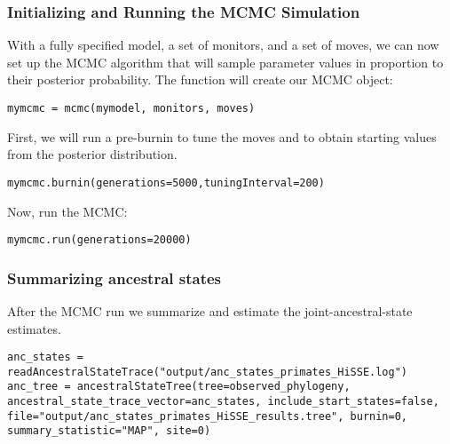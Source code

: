 \subsubsection{Initializing and Running the MCMC Simulation}

With a fully specified model, a set of monitors, and a set of moves, we can now set up the MCMC algorithm that will sample parameter values in proportion to their posterior probability. 
The  function will create our MCMC object:
{\tt \begin{snugshade*}
\begin{lstlisting}
mymcmc = mcmc(mymodel, monitors, moves)
\end{lstlisting}
\end{snugshade*}}

First, we will run a pre-burnin to tune the moves and to obtain starting values from the posterior distribution.
{\tt \begin{snugshade*}
\begin{lstlisting}
mymcmc.burnin(generations=5000,tuningInterval=200)
\end{lstlisting}
\end{snugshade*}}

Now, run the MCMC:
{\tt \begin{snugshade*}
\begin{lstlisting}
mymcmc.run(generations=20000)
\end{lstlisting}
\end{snugshade*}}


\subsubsection{Summarizing ancestral states}
After the MCMC run we summarize and estimate the joint-ancestral-state estimates.
{\tt \begin{snugshade*}
\begin{lstlisting}
anc_states = readAncestralStateTrace("output/anc_states_primates_HiSSE.log")
anc_tree = ancestralStateTree(tree=observed_phylogeny, ancestral_state_trace_vector=anc_states, include_start_states=false, file="output/anc_states_primates_HiSSE_results.tree", burnin=0, summary_statistic="MAP", site=0)
\end{lstlisting}
\end{snugshade*}}



